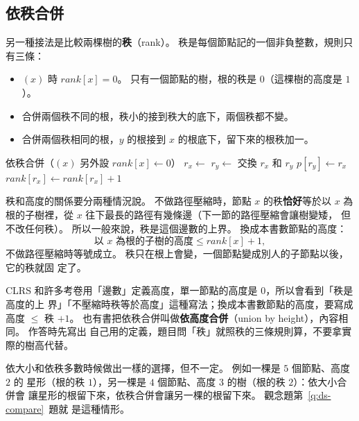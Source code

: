 \subsection{依秩合併}
\label{sec:ds-rank}

另一種接法是比較兩棵樹的\textbf{秩}（rank）。 秩是每個節點記的一個非負整數，規則只
有三條：

\begin{itemize}
\item {}$(x)$ 時 $\mathit{rank}[x] = 0$。 只有一個節點的樹，根的秩是
$0$（這棵樹的高度是 $1$）。
\item 合併兩個秩不同的根，秩小的接到秩大的底下，兩個秩都不變。
\item 合併兩個秩相同的根，$y$ 的根接到 $x$ 的根底下，留下來的根秩加一。
\end{itemize}

\begin{pseudo}[label=alg:ds-rank]{依秩合併（$(x)$ 另外設 $\mathit{rank}[x] \gets 0$）}
    \State $r_x \gets$ 
    \State $r_y \gets$ 
        \State \Return
    \EndIf
        \State 交換 $r_x$ 和 $r_y$
    \EndIf
    \State $p[r_y] \gets r_x$
        \State $\mathit{rank}[r_x] \gets \mathit{rank}[r_x] + 1$
    \EndIf
\EndProcedure
\end{pseudo}

秩和高度的關係要分兩種情況說。 不做路徑壓縮時，節點 $x$ 的秩\textbf{恰好}等於以 $x$
為根的子樹裡，從 $x$ 往下最長的路徑有幾條邊（下一節的路徑壓縮會讓樹變矮，
但不改任何秩）。 所以一般來說，秩是這個邊數的上界。 換成本書數節點的高度：
\[
\text{以 $x$ 為根的子樹的高度} \le \mathit{rank}[x] + 1,
\]
不做路徑壓縮時等號成立。 秩只在根上會變，一個節點變成別人的子節點以後，它的秩就固
定了。

\begin{examnote}
CLRS 和許多考卷用「邊數」定義高度，單一節點的高度是 $0$，所以會看到「秩是高度的上
界」「不壓縮時秩等於高度」這種寫法；換成本書數節點的高度，要寫成高度 $\le$ 秩 $+ 1$。
也有書把依秩合併叫做\textbf{依高度合併}（union by height），內容相同。 作答時先寫出
自己用的定義，題目問「秩」就照秩的三條規則算，不要拿實際的樹高代替。
\end{examnote}

依大小和依秩多數時候做出一樣的選擇，但不一定。 例如一棵是 $5$ 個節點、高度 $2$ 的
星形（根的秩 $1$），另一棵是 $4$ 個節點、高度 $3$ 的樹（根的秩 $2$）：依大小合併會
讓星形的根留下來，依秩合併會讓另一棵的根留下來。 觀念題第~\ref{q:ds-compare}~題就
是這種情形。

